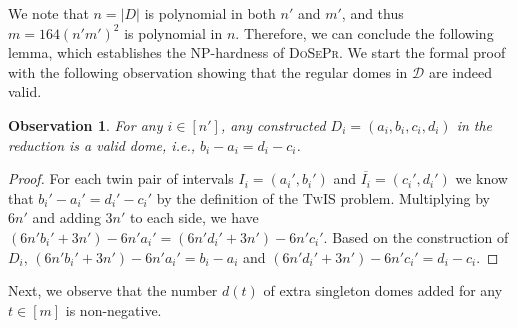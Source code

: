 \documentclass[letterpaper,11pt]{article}
\newtheorem{observation}{Observation}[section]
\newcommand{\tis}{\textsc{TwIS}\xspace}
\newcommand{\dspr}{\textsc{DoSePr}\xspace}
\begin{document}
We note that $n=|D|$ is polynomial in both $n'$ and $m'$, and thus $m=164(n'm')^2$ is polynomial in $n$. Therefore, we can conclude the following lemma, which establishes the NP-hardness of \dspr. We start the formal proof with the following observation showing that the regular domes in $\mathcal{D}$ are indeed valid. 

\begin{observation}\label{obs:indeeddome}
For any $i\in[n']$, any constructed $D_i = (a_i,b_i,c_i,d_i)$ in the reduction is a valid dome, i.e., $b_i - a_i = d_i - c_i$. 
\end{observation}
\begin{proof}
For each twin pair of intervals $I_i = (a_i',b_i')$ and $\overline{I_i} = (c_i',d_i')$ we know that $b_i'-a_i' = d_i' - c_i'$ by the definition of the \tis problem. Multiplying by $6n'$ and adding $3n'$ to each side, we have $(6n'b_i' + 3n') - 6n'a_i' = (6n'd_i' + 3n') - 6n'c_i'$. Based on the construction of $D_i$, $(6n'b_i' + 3n') - 6n'a_i'=b_i-a_i$ and $(6n'd_i' + 3n') - 6n'c_i'=d_i-c_i$.
\end{proof}


Next, we observe that the number $d(t)$ of extra singleton domes added for any $t\in [m]$ is non-negative.
\end{document}

